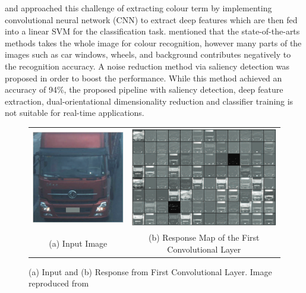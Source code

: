  and  approached this challenge of
extracting colour term by implementing convolutional neural network (CNN) to
extract deep features which are then fed into a linear SVM for the
classification task.  mentioned that the
state-of-the-arts methods takes the whole image for colour recognition, however
many parts of the images such as car windows, wheels, and background contributes
negatively to the recognition accuracy. A noise reduction method via saliency
detection was proposed in order to boost the performance. While this method
achieved an accuracy of 94\%, the proposed pipeline with saliency detection,
deep feature extraction, dual-orientational dimensionality reduction and
classifier training is not suitable for real-time applications.

\begin{figure}[!htb] \centering
\begin{tabular}{cc}
 \includegraphics[width=0.4\linewidth]{image/lit/hu1.png} &
 \includegraphics[width=0.6\linewidth]{image/lit/hu2.png} \\
 (a) Input Image & (b) Response Map of the First Convolutional Layer \\
\end{tabular}
\caption[(a) Input and (b) Response from First Convolutional Layer]{(a) Input
and (b) Response from First Convolutional Layer. Image reproduced from
\label{fig:responseFCL}}
\end{figure}

